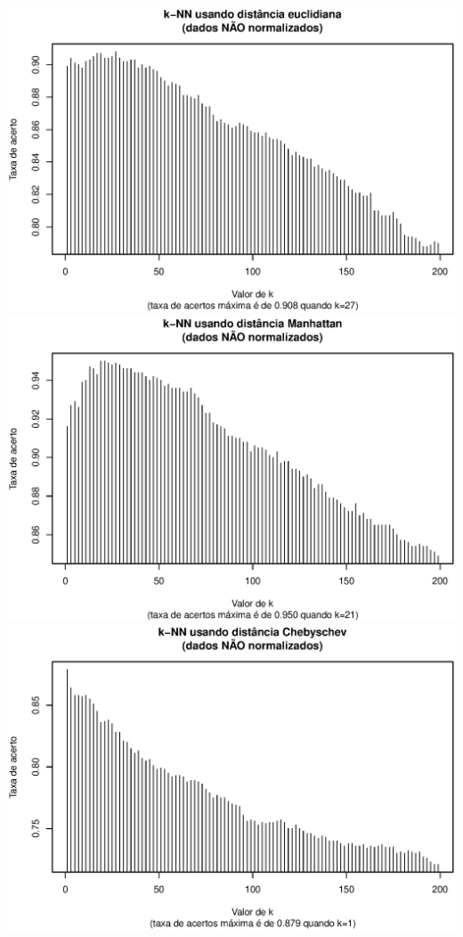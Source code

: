 \documentclass[10pt,a4paper,twocolumn]{article}
\begin{document}
      \includegraphics[scale=0.33]{graficos/euclidiana_0.ps}
      \includegraphics[scale=0.33]{graficos/manhattan_0.ps}
      \includegraphics[scale=0.33]{graficos/chebyschev_0.ps}
\end{document}
